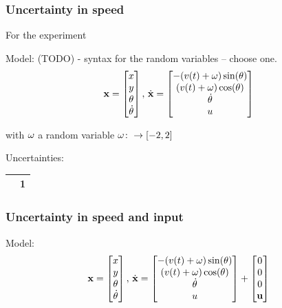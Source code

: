 \subsubsection{Uncertainty in speed}

For the experiment

Model: (TODO) - syntax for the random variables -- choose one.
\begin{equation}
  \label{eq:model-dynamics}
  \mathbf{x} =
  \begin{bmatrix}
    x \\ y \\ \theta \\ \dot{\theta} \\
  \end{bmatrix}, \, \dot{\mathbf{x}} =
  \begin{bmatrix}
    -(v(t) + \mathbf{\omega}{}) \sin(\theta) \\
    (v(t) + \mathbf{\omega}{}) \cos(\theta) \\
    \dot{\theta} \\
    u \\
  \end{bmatrix}
\end{equation}

with \(\mathbf{\omega}{}\) a random variable \(\mathbf{\omega}{} \colon
\rightarrow [-2,2]\)

Uncertainties:
\begin{tabular}{ |c|c| }
  \hline
  \randomSpeedVar{} & 1 \\
  \hline
\end{tabular}

\subsubsection{Uncertainty in speed and input}
Model:
\begin{equation}
  \label{eq:model-dynamics}
  \mathbf{x} =
  \begin{bmatrix}
    x \\ y \\ \theta \\ \dot{\theta} \\
  \end{bmatrix}, \, \dot{\mathbf{x}} =
  \begin{bmatrix}
    -(v(t) + \mathbf{\omega}{}) \sin(\theta) \\
    (v(t) + \mathbf{\omega}{}) \cos(\theta) \\
    \dot{\theta} \\
    u \\
  \end{bmatrix}
  +
  \begin{bmatrix}
    0 \\
    0 \\
    0 \\
    {\mathbf{u}}{} \\
  \end{bmatrix}
\end{equation}

